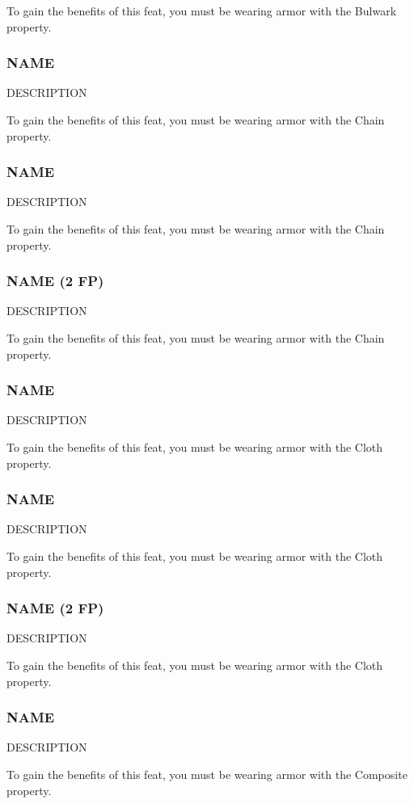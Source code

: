     To gain the benefits of this feat, you must be wearing armor with the Bulwark property.
\subsubsection{NAME} \label{feat::name}
    DESCRIPTION

    To gain the benefits of this feat, you must be wearing armor with the Chain property.
\subsubsection{NAME} \label{feat::name}
    DESCRIPTION

    To gain the benefits of this feat, you must be wearing armor with the Chain property.
\subsubsection{NAME (2 FP)} \label{feat::name}
    DESCRIPTION

    To gain the benefits of this feat, you must be wearing armor with the Chain property.
\subsubsection{NAME} \label{feat::name}
    DESCRIPTION

    To gain the benefits of this feat, you must be wearing armor with the Cloth property.
\subsubsection{NAME} \label{feat::name}
    DESCRIPTION

    To gain the benefits of this feat, you must be wearing armor with the Cloth property.
\subsubsection{NAME (2 FP)} \label{feat::name}
    DESCRIPTION

    To gain the benefits of this feat, you must be wearing armor with the Cloth property.
\subsubsection{NAME} \label{feat::name}
    DESCRIPTION

    To gain the benefits of this feat, you must be wearing armor with the Composite property.

